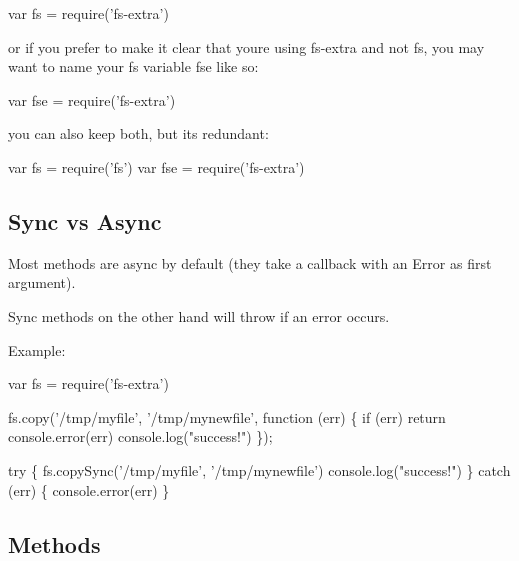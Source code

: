 \begin{DoxyCode}
var fs = require('fs-extra')
\end{DoxyCode}


or if you prefer to make it clear that you\textquotesingle{}re using {\ttfamily fs-\/extra} and not {\ttfamily fs}, you may want to name your {\ttfamily fs} variable {\ttfamily fse} like so\+:


\begin{DoxyCode}
var fse = require('fs-extra')
\end{DoxyCode}


you can also keep both, but it\textquotesingle{}s redundant\+:


\begin{DoxyCode}
var fs = require('fs')
var fse = require('fs-extra')
\end{DoxyCode}


\subsection*{Sync vs Async }

Most methods are async by default (they take a callback with an {\ttfamily Error} as first argument).

Sync methods on the other hand will throw if an error occurs.

Example\+:


\begin{DoxyCode}
var fs = require('fs-extra')

fs.copy('/tmp/myfile', '/tmp/mynewfile', function (err) \{
  if (err) return console.error(err)
  console.log("success!")
\});

try \{
  fs.copySync('/tmp/myfile', '/tmp/mynewfile')
  console.log("success!")
\} catch (err) \{
  console.error(err)
\}
\end{DoxyCode}


\subsection*{Methods }


